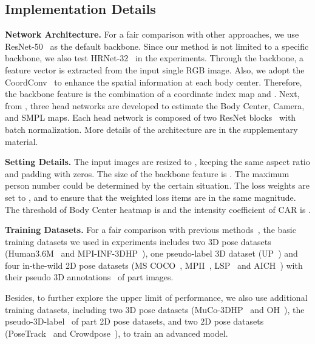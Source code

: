 \documentclass[10pt,twocolumn,letterpaper]{article}
\begin{document}
\vspace{-1mm}
\subsection{Implementation Details}
\vspace{-1mm}

\textbf{Network Architecture.} 
For a fair comparison with other approaches, we use ResNet-50~\cite{resnet} as the default backbone.
Since our method is not limited to a specific backbone, we also test HRNet-32~\cite{cheng2020bottom} in the experiments.
Through the backbone, a feature vector  is extracted from the input single RGB image. 
Also, we adopt the CoordConv~\cite{liu2018coordconv} to enhance the spatial information at each body center.
Therefore, the backbone feature  is the combination of a coordinate index map  and .
Next, from , three head networks are developed to estimate the Body Center, Camera, and SMPL maps. Each head network is composed of two ResNet blocks~\cite{resnet} with batch normalization. More details of the architecture are in the supplementary material.

\textbf{Setting Details.} 
The input images are resized to , keeping the same aspect ratio and padding with zeros. 
The size of the backbone feature is . 
The maximum person number  could be determined by the certain situation.
The loss weights are set to , and  to ensure that the weighted loss items are in the same magnitude.
The threshold of Body Center heatmap is  and the intensity coefficient of CAR is . 

\textbf{Training Datasets.}
For a fair comparison with previous methods~\cite{jiang2020coherent,hmr,kolotouros2019spin,sun2019dsd-satn}, the basic training datasets we used in experiments includes two 3D pose datasets (Human3.6M~\cite{h36m} and MPI-INF-3DHP~\cite{mono-3dhp2017}), one pseudo-label 3D dataset (UP~\cite{unite}) and four in-the-wild 2D pose datasets (MS COCO~\cite{coco}, MPII~\cite{mpii}, LSP~\cite{lsp,lsp_extended} and AICH~\cite{aich}) with their pseudo 3D annotations~\cite{kolotouros2019spin} of part images.

Besides, to further explore the upper limit of performance, we also use additional training datasets, including two 3D pose datasets (MuCo-3DHP~\cite{mono-3dhp2017} and OH~\cite{zhang2020object}), the pseudo-3D-label~\cite{joo2020eft} of part 2D pose datasets, and two 2D pose datasets (PoseTrack~\cite{PoseTrack} and Crowdpose~\cite{crowdpose}), to train an advanced model.
\end{document}
